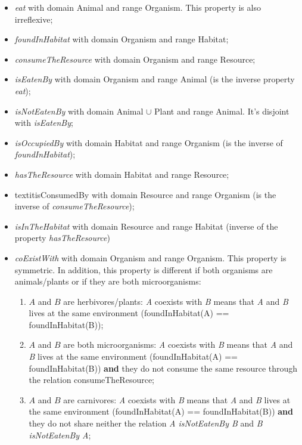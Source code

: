     \begin{itemize}
        \item \textit{eat} with domain Animal and range Organism. This property is also irreflexive;

        \item \textit{foundInHabitat} with domain Organism and range Habitat;

        \item \textit{consumeTheResource} with domain Organism and range Resource;

        \item \textit{isEatenBy} with domain Organism and range Animal (is the inverse property \textit{eat});

        \item \textit{isNotEatenBy} with domain Animal $\cup$ Plant and range Animal. It's disjoint with \textit{isEatenBy};

        \item \textit{isOccupiedBy} with domain Habitat and range Organism (is the inverse of \textit{foundInHabitat});

        \item \textit{hasTheResource} with domain Habitat and range Resource;

        \item textit{isConsumedBy} with domain Resource and range Organism (is the inverse of \textit{consumeTheResource});

        \item \textit{isInTheHabitat} with domain Resource and range Habitat (inverse of the property \textit{hasTheResource})

        \item \textit{coExistWith} with domain Organism and range Organism. This property is symmetric. In addition, this property is different if both organisms are animals/plants or if they are both microorganisms:
        \begin{enumerate}
            \item $A$ and $B$ are herbivores/plants: \textit{A} coexists with \textit{B} means that \textit{A} and \textit{B} lives at the same environment (foundInHabitat(A) == foundInHabitat(B));

            \item $A$ and $B$ are both microorganisms: \textit{A} coexists with \textit{B} means that \textit{A} and \textit{B} lives at the same environment (foundInHabitat(A) == foundInHabitat(B)) \textbf{and} they do not consume the same resource through the relation consumeTheResource;

            \item $A$ and $B$ are carnivores: \textit{A} coexists with \textit{B} means that \textit{A} and \textit{B} lives at the same environment (foundInHabitat(A) == foundInHabitat(B)) \textbf{and} they do not share neither the relation \textit{A isNotEatenBy B} and \textit{B isNotEatenBy A};
            \\
            
        \end{enumerate}
    \end{itemize}

